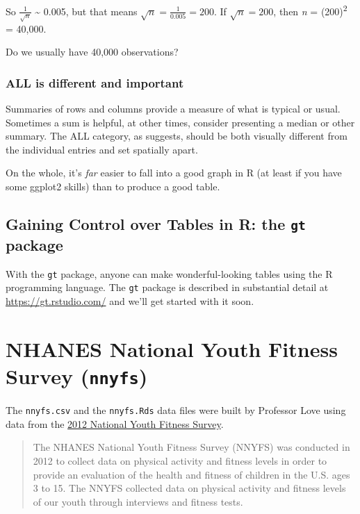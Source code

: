 \documentclass[
]{book}
\begin{document}
So \(\frac{1}{\sqrt{n}}\) \textasciitilde{} 0.005, but that means \(\sqrt{n} = \frac{1}{0.005} = 200\). If \(\sqrt{n} = 200\), then \emph{n} = (200)\textsuperscript{2} = 40,000.

Do we usually have 40,000 observations?

\hypertarget{all-is-different-and-important}{%
\subsection{ALL is different and important}\label{all-is-different-and-important}}

Summaries of rows and columns provide a measure of what is typical or usual. Sometimes a sum is helpful, at other times, consider presenting a median or other summary. The ALL category, as \citet{HW_VisualRevelations} suggests, should be both visually different from the individual entries and set spatially apart.

On the whole, it's \emph{far} easier to fall into a good graph in R (at least if you have some ggplot2 skills) than to produce a good table.

\hypertarget{gaining-control-over-tables-in-r-the-gt-package}{%
\section{\texorpdfstring{Gaining Control over Tables in R: the \texttt{gt} package}{Gaining Control over Tables in R: the gt package}}\label{gaining-control-over-tables-in-r-the-gt-package}}

With the \texttt{gt} package, anyone can make wonderful-looking tables using the R programming language. The \texttt{gt} package is described in substantial detail at \url{https://gt.rstudio.com/} and we'll get started with it soon.

\hypertarget{NYFS-Study}{%
\chapter{\texorpdfstring{NHANES National Youth Fitness Survey (\texttt{nnyfs})}{NHANES National Youth Fitness Survey (nnyfs)}}\label{NYFS-Study}}

The \texttt{nnyfs.csv} and the \texttt{nnyfs.Rds} data files were built by Professor Love using data from the \href{http://www.cdc.gov/Nchs/Nnyfs.htm}{2012 National Youth Fitness Survey}.

\begin{quote}
The NHANES National Youth Fitness Survey (NNYFS) was conducted in 2012 to collect data on physical activity and fitness levels in order to provide an evaluation of the health and fitness of children in the U.S. ages 3 to 15. The NNYFS collected data on physical activity and fitness levels of our youth through interviews and fitness tests.
\end{quote}
\end{document}
